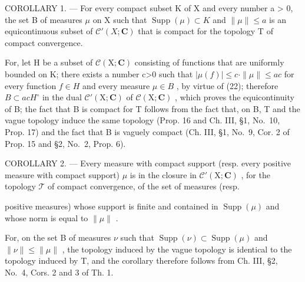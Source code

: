 COROLLARY 1. --- For every compact subset K of X and every number a \textgreater{} 0, the set B of measures \(\mu\) on X such that \(\operatorname{Supp}(\mu) \subset K\) and \(\|\mu\| \leqslant a\) is an equicontinuous subset of \(\mathcal{C}'(X; \mathbf{C})\) that is compact for the topology T of compact convergence.

For, let H be a subset of \(\mathcal{C}(\mathrm{X};\mathbf{C})\) consisting of functions that are uniformly bounded on K; there exists a number c\textgreater0 such that \(|\mu(f)|\leqslant c\cdot\|\mu\|\leqslant ac\) for every function \(f\in H\) and every measure \(\mu\in B\) , by virtue of (22); therefore \(B\subset acH^{\circ}\) in the dual \(\mathcal{C}'(\mathrm{X};\mathbf{C})\) of \(\mathcal{C}(\mathrm{X};\mathbf{C})\) , which proves the equicontinuity of B; the fact that B is compact for T follows from the fact that, on B, T and the vague topology induce the same topology (Prop. 16 and Ch. III, §1, No.~10, Prop. 17) and the fact that B is vaguely compact (Ch. III, §1, No.~9, Cor. 2 of Prop. 15 and §2, No.~2, Prop. 6).

COROLLARY 2. --- Every measure with compact support (resp. every positive measure with compact support) \(\mu\) is in the closure in \(\mathcal{C}'(\mathrm{X};\mathbf{C})\) , for the topology \(\mathcal{T}\) of compact convergence, of the set of measures (resp.

positive measures) whose support is finite and contained in \(\operatorname{Supp}(\mu)\) and whose norm is equal to \(\| \mu \|\) .

For, on the set B of measures \(\nu\) such that \(\operatorname{Supp}(\nu) \subset \operatorname{Supp}(\mu)\) and \(\|\nu\| \leqslant \|\mu\|\) , the topology induced by the vague topology is identical to the topology induced by T, and the corollary therefore follows from Ch. III, §2, No.~4, Cors. 2 and 3 of Th. 1.

